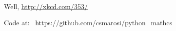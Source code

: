 \documentclass{article}
\begin{document}
Well, \url{http://xkcd.com/353/}

Code at: \mbox{ \url{https://github.com/csmarosi/python_mathcs} }
\end{document}
